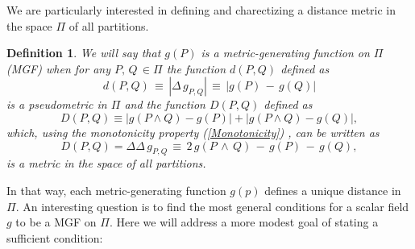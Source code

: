 \documentclass[twocolumn,aps,sort,nofootinbib]{revtex4}
\newtheorem{definition}{Definition}
\begin{document}
\begin{appendix}
We are particularly interested in defining and charectizing a distance metric
in the space $\Pi$ of all partitions.
\begin{definition}
We will say that $g(P)$ is a {\sl metric-generating} function on $\Pi$ (MGF) when for any 
$P,\,Q\,\in\Pi$ 
the function $d(P,Q)$ defined as 
\begin{equation}
d(P,Q)\,\equiv\,\left|\Delta\,g_{P,Q}\right|\,\equiv\,\left|g(P)\,-\,g(Q)\right|
\label{PseudoMetric}
\end{equation}
is a pseudometric in $\Pi$ and the function
$D(P,Q)$ defined as
\begin{equation}
D(P,Q)\equiv\left| g(P\wedge Q) - g(P)\right| + \left|g(P\wedge Q) - g(Q)\right|,
\label{Metric}
\end{equation}
which, using the monotonicity property (\ref{Monotonicity}) , can be written as
\begin{equation}
D(P,Q)=\Delta\Delta\,g_{P,Q}\,\equiv\, 2\,g\left(  P\,\wedge\,Q\right)\,-\,g(P)\,-\,g(Q ),
\label{ThermoMetric}
\end{equation}
is a metric in the space of all partitions. 
\end{definition}
In that way, each metric-generating function
$g(p)$ defines a unique distance in $\Pi$. 
An interesting question is to find the most general conditions for a scalar 
field $g$ to be a MGF on $\Pi$. Here we will address a more modest goal of 
stating a sufficient condition:


\end{appendix}
\end{document}
